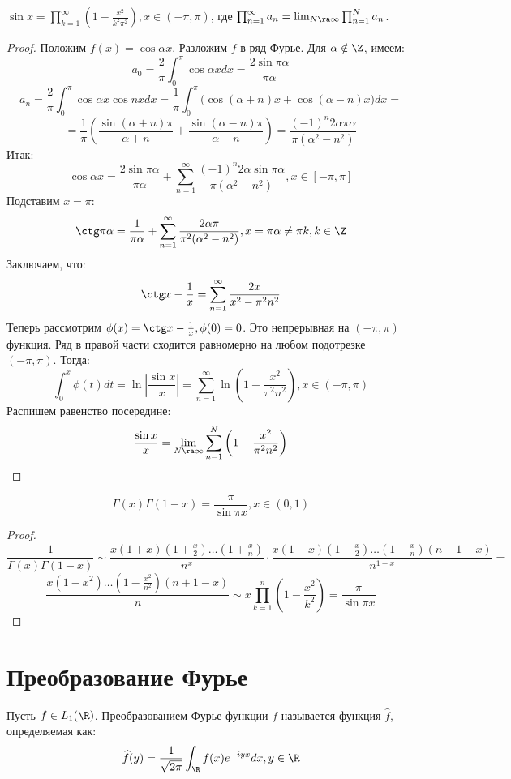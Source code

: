 \begin{lemma}
    \(\sin x = \prod_{k = 1}^\infty \left( 1 - \frac{x^2}{k^2\pi^2} \right), x \in (-\pi, \pi)\), где \(\prod_{n = 1}^\infty a_n = \lim_{N \ra \infty}\prod_{n = 1}^N a_n\).
\end{lemma}
\begin{proof}
    Положим \(f(x) = \cos \alpha x\). Разложим \(f\) в ряд Фурье. Для \(\alpha \notin \Z\), имеем:
    \[a_0 = \frac{2}{\pi}\int_0^{\pi} \cos\alpha x dx = \frac{2\sin \pi\alpha}{\pi\alpha}\]
    \[a_n = \frac{2}{\pi}\int_0^{\pi} \cos\alpha x \cos nx dx = \frac{1}{\pi}\int_0^{\pi} \big(\cos(\alpha + n) x + \cos(\alpha - n) x\big) dx =\]
    \[= \frac{1}{\pi}\left( \frac{\sin(\alpha + n)\pi}{\alpha + n} + \frac{\sin(\alpha - n)\pi}{\alpha - n} \right) = \frac{(-1)^n2\alpha\pi\alpha}{\pi(\alpha^2 - n^2)}\]
    Итак:
    \[\cos\alpha x = \frac{2\sin \pi\alpha}{\pi\alpha} + \sum_{n = 1}^\infty \frac{(-1)^n2\alpha\sin\pi\alpha}{\pi(\alpha^2 - n^2)}, x \in [-\pi, \pi]\]
    Подставим \(x = \pi\):
    \[\ctg \pi\alpha = \frac{1}{\pi\alpha} + \sum_{n = 1}^\infty \frac{2\alpha\pi}{\pi^2(\alpha^2 - n^2)}, x = \pi\alpha \ne \pi k, k \in \Z\]
    Заключаем, что:
    \[\ctg x - \frac{1}{x} = \sum_{n = 1}^\infty \frac{2x}{x^2 - \pi^2n^2}\]
    Теперь рассмотрим \(\phi(x) = \ctg x - \frac{1}{x}, \phi(0) = 0\). Это непрерывная на \((-\pi, \pi)\) функция. Ряд в правой части сходится равномерно на любом подотрезке \((-\pi, \pi)\). Тогда:
    \[\int_0^x \phi(t)dt = \ln\left| \frac{\sin x}{x} \right| = \sum_{n = 1}^\infty \ln\left( 1 - \frac{x^2}{\pi^2n^2} \right), x \in (-\pi, \pi)\]
    Распишем равенство посередине:
    \[\frac{\sin x}{x} = \lim_{N \ra \infty}\sum_{n = 1}^{N}\left( 1 - \frac{x^2}{\pi^2n^2} \right)\]
\end{proof}

\begin{theorem}
    \[\Gamma(x)\Gamma(1 - x) = \frac{\pi}{\sin \pi x}, x \in (0, 1)\]
\end{theorem}
\begin{proof}
    \[\frac{1}{\Gamma(x)\Gamma(1 - x)} \sim \frac{x(1 + x)\left( 1 + \frac{x}{2} \right)\dots\left( 1 + \frac{x}{n} \right)}{n^x}\cdot \frac{x(1 - x)\left( 1 - \frac{x}{2} \right)\dots\left( 1 - \frac{x}{n} \right)(n + 1 - x)}{n^{1 - x}} =\]
    \[\frac{x(1 - x^2)\dots\left( 1 - \frac{x^2}{n^2} \right)(n + 1 - x)}{n} \sim x\prod_{k = 1}^n\left( 1 - \frac{x^2}{k^2} \right) = \frac{\pi}{\sin \pi x}\]
\end{proof}

\section{Преобразование Фурье}
\begin{definition}
    Пусть \(f \in L_1(\R)\). Преобразованием Фурье функции \(f\) называется функция \(\widehat{f}\), определяемая как:
    \[\widehat{f}(y) = \frac{1}{\sqrt{2\pi}}\int_\R f(x)e^{-iyx}dx, y \in \R\]
\end{definition}

